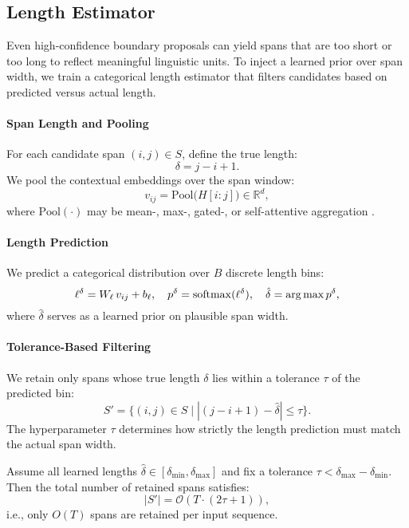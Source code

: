 \subsection{Length Estimator}
\label{sec:length-estimator}

Even high-confidence boundary proposals can yield spans that are too short or too long to reflect meaningful linguistic units. To inject a learned prior over span width, we train a categorical length estimator that filters candidates based on predicted versus actual length.

\paragraph{Span Length and Pooling}

For each candidate span \((i,j)\in S\), define the true length:
\[
\delta = j - i + 1.
\]
We pool the contextual embeddings over the span window:
\[
v_{ij} = \mathrm{Pool}\bigl(H[i{:}j]\bigr)\in\mathbb{R}^d,
\]
where \(\mathrm{Pool}(\cdot)\) may be mean-, max-, gated-, or self-attentive aggregation \cite{tay2021charformer}.

\paragraph{Length Prediction}

We predict a categorical distribution over \(B\) discrete length bins:
\[
\ell^\delta = W_\ell\,v_{ij} + b_\ell,
\quad
p^\delta = \mathrm{softmax}(\ell^\delta),
\quad
\hat\delta = \arg\max p^\delta,
\]
where \(\hat\delta\) serves as a learned prior on plausible span width.

\paragraph{Tolerance-Based Filtering}

We retain only spans whose true length \(\delta\) lies within a tolerance \(\tau\) of the predicted bin:
\[
S' = \bigl\{(i,j)\in S \mid |(j-i+1) - \hat\delta| \le \tau \bigr\}.
\]
The hyperparameter \(\tau\) determines how strictly the length prediction must match the actual span width.

\begin{proposition}
	\label{prop:span-length-bound}
	Assume all learned lengths \(\hat\delta\in[\delta_{\min},\delta_{\max}]\) and fix a tolerance \(\tau<\delta_{\max}-\delta_{\min}\). Then the total number of retained spans satisfies:
	\[
	|S'| = \mathcal{O}(T\cdot(2\tau+1)),
	\]
	i.e., only \(O(T)\) spans are retained per input sequence.
\end{proposition}

